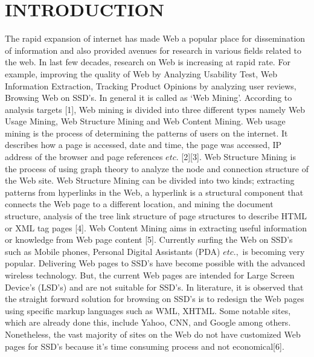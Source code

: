\documentclass[fleqn,twoside]{article}
\begin{document}
\section{INTRODUCTION}
The rapid expansion of internet has made Web a popular place for dissemination of information and also provided avenues for research in various fields related to the web. In last few decades, research on Web is increasing at rapid rate. For example, improving the quality of Web by Analyzing Usability Test, Web Information Extraction, Tracking Product Opinions by analyzing user reviews, Browsing Web on SSD's. In general it is called as ‘Web Mining’.
\vskip 2mm
According to analysis targets [1], Web mining is divided into three different types namely Web Usage Mining, Web Structure Mining and Web Content Mining. Web usage mining is the process of determining the patterns of users on the internet. It describes how a page is accessed, date and time, the page was accessed, IP address of the browser and page references $etc.$ [2][3]. Web Structure Mining is the process of using graph theory to analyze the node and connection structure of the Web site.  Web Structure Mining can be divided into two kinds; extracting patterns from hyperlinks in the Web, a hyperlink is a structural component that connects the Web page to a different location, and mining the document structure, analysis of the tree link structure of page structures to describe HTML or XML tag pages [4]. Web Content Mining aims in extracting useful information or knowledge from Web page content [5].
\vskip 2mm
Currently surfing the Web on SSD's such as Mobile phones, Personal Digital Assistants (PDA) $etc.,$ is becoming very popular. Delivering Web pages to SSD's have become possible with the advanced wireless technology. But, the current Web pages are intended for Large Screen Device's (LSD's) and are not suitable for SSD's. In literature, it is observed that the straight forward solution for browsing on SSD's is to redesign the Web pages using specific markup languages such as WML, XHTML. Some notable sites, which are already done this, include Yahoo, CNN, and Google among others. Nonetheless, the vast majority of sites on
the Web do not have customized Web pages for SSD's because it's time consuming process and not economical[6]. 
\vskip 2mm
\end{document}
